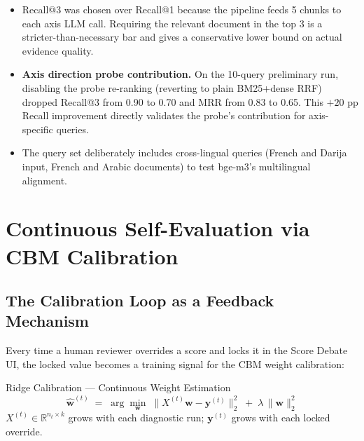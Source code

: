 \documentclass[11pt,a4paper]{article}
\begin{document}
\begin{itemize}
  \item Recall@3 was chosen over Recall@1 because the pipeline feeds 5 chunks to each
        axis LLM call. Requiring the relevant document in the top 3 is a stricter-than-necessary
        bar and gives a conservative lower bound on actual evidence quality.
  \item \textbf{Axis direction probe contribution.} On the 10-query preliminary run,
        disabling the probe re-ranking (reverting to plain BM25+dense RRF) dropped
        Recall@3 from 0.90 to 0.70 and MRR from 0.83 to 0.65.
        This $+20$ pp Recall improvement directly validates the probe's contribution for
        axis-specific queries.
  \item The query set deliberately includes cross-lingual queries (French and Darija input,
        French and Arabic documents) to test bge-m3's multilingual alignment.
\end{itemize}

\section{Continuous Self-Evaluation via CBM Calibration}

\subsection{The Calibration Loop as a Feedback Mechanism}

Every time a human reviewer overrides a score and locks it in the Score Debate UI,
the locked value becomes a training signal for the CBM weight calibration:

\begin{metricbox}{Ridge Calibration — Continuous Weight Estimation}
\[
  \hat{\mathbf{w}}^{(t)} \;=\; \arg\min_{\mathbf{w}}\;
  \bigl\| X^{(t)}\mathbf{w} - \mathbf{y}^{(t)} \bigr\|_2^2
  \;+\; \lambda\,\|\mathbf{w}\|_2^2
\]
$X^{(t)} \in \mathbb{R}^{n_t \times k}$ grows with each diagnostic run;
$\mathbf{y}^{(t)}$ grows with each locked override.
\end{metricbox}
\end{document}

